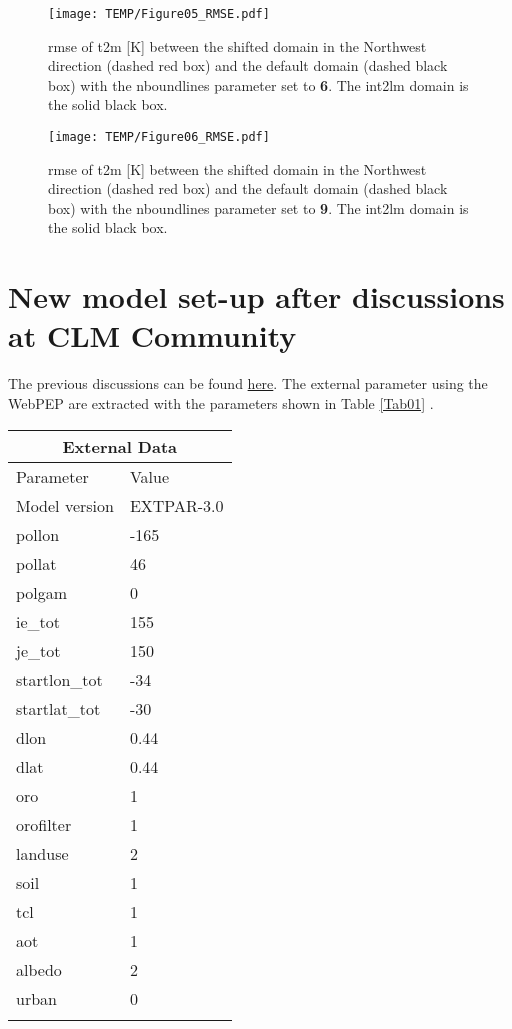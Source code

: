 \documentclass[a4paper,10pt]{report}
\begin{document}
\begin{figure}%
\texttt{[image: TEMP/Figure05\_RMSE.pdf]}
\caption{\ac{rmse} of \ac{t2m} [K] between the shifted domain in the Northwest direction (dashed red box) and the default domain (dashed black box) with the nboundlines parameter set to \textbf{6}. The int2lm domain is the solid black box.}
\label{Fig05}
\end{figure}

\begin{figure}%
\texttt{[image: TEMP/Figure06\_RMSE.pdf]}
\caption{\ac{rmse} of \ac{t2m} [K] between the shifted domain in the Northwest direction (dashed red box) and the default domain (dashed black box) with the nboundlines parameter set to \textbf{9}. The int2lm domain is the solid black box.}
\label{Fig06}
\end{figure}

\section{New model set-up after discussions at CLM Community}
The previous discussions can be found \href{http://redc.clm-community.eu/boards/10/topics/530?r=537#message-537}{here}. The external parameter using the WebPEP are extracted with the parameters shown in Table \ref{Tab01} . \par
\begin{tabular}[t]{ |p{3cm}|p{3cm}|  }
\hline
\multicolumn{2}{|c|}{External Data} \\
\hline
Parameter & Value \\
\hline
Model version &  EXTPAR-3.0\\
pollon & -165\\
pollat & 46\\
polgam & 0\\
ie\_tot & 155\\
je\_tot & 150\\
startlon\_tot & -34\\
startlat\_tot & -30\\
dlon & 0.44\\
dlat & 0.44\\
oro & 1\\
orofilter & 1\\
landuse &2\\
soil &1\\
tcl & 1\\
aot & 1\\
albedo & 2\\
urban & 0\\
\hline

\label{Tab01}
\end{tabular}
\end{document}
